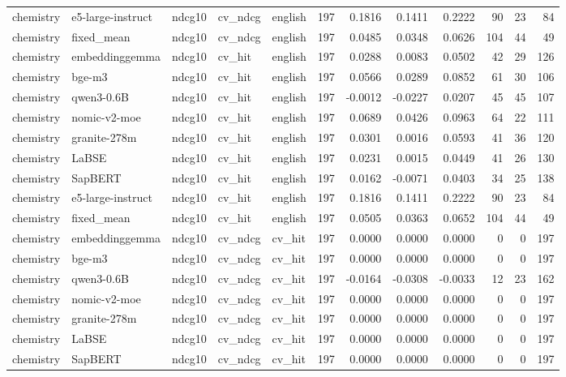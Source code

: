 \begin{tabular}{lllllrrrrrrr}
chemistry & e5-large-instruct & ndcg10 & cv\_ndcg & english & 197 & 0.1816 & 0.1411 & 0.2222 & 90 & 23 & 84 \\
chemistry & fixed\_mean & ndcg10 & cv\_ndcg & english & 197 & 0.0485 & 0.0348 & 0.0626 & 104 & 44 & 49 \\
chemistry & embeddinggemma & ndcg10 & cv\_hit & english & 197 & 0.0288 & 0.0083 & 0.0502 & 42 & 29 & 126 \\
chemistry & bge-m3 & ndcg10 & cv\_hit & english & 197 & 0.0566 & 0.0289 & 0.0852 & 61 & 30 & 106 \\
chemistry & qwen3-0.6B & ndcg10 & cv\_hit & english & 197 & -0.0012 & -0.0227 & 0.0207 & 45 & 45 & 107 \\
chemistry & nomic-v2-moe & ndcg10 & cv\_hit & english & 197 & 0.0689 & 0.0426 & 0.0963 & 64 & 22 & 111 \\
chemistry & granite-278m & ndcg10 & cv\_hit & english & 197 & 0.0301 & 0.0016 & 0.0593 & 41 & 36 & 120 \\
chemistry & LaBSE & ndcg10 & cv\_hit & english & 197 & 0.0231 & 0.0015 & 0.0449 & 41 & 26 & 130 \\
chemistry & SapBERT & ndcg10 & cv\_hit & english & 197 & 0.0162 & -0.0071 & 0.0403 & 34 & 25 & 138 \\
chemistry & e5-large-instruct & ndcg10 & cv\_hit & english & 197 & 0.1816 & 0.1411 & 0.2222 & 90 & 23 & 84 \\
chemistry & fixed\_mean & ndcg10 & cv\_hit & english & 197 & 0.0505 & 0.0363 & 0.0652 & 104 & 44 & 49 \\
chemistry & embeddinggemma & ndcg10 & cv\_ndcg & cv\_hit & 197 & 0.0000 & 0.0000 & 0.0000 & 0 & 0 & 197 \\
chemistry & bge-m3 & ndcg10 & cv\_ndcg & cv\_hit & 197 & 0.0000 & 0.0000 & 0.0000 & 0 & 0 & 197 \\
chemistry & qwen3-0.6B & ndcg10 & cv\_ndcg & cv\_hit & 197 & -0.0164 & -0.0308 & -0.0033 & 12 & 23 & 162 \\
chemistry & nomic-v2-moe & ndcg10 & cv\_ndcg & cv\_hit & 197 & 0.0000 & 0.0000 & 0.0000 & 0 & 0 & 197 \\
chemistry & granite-278m & ndcg10 & cv\_ndcg & cv\_hit & 197 & 0.0000 & 0.0000 & 0.0000 & 0 & 0 & 197 \\
chemistry & LaBSE & ndcg10 & cv\_ndcg & cv\_hit & 197 & 0.0000 & 0.0000 & 0.0000 & 0 & 0 & 197 \\
chemistry & SapBERT & ndcg10 & cv\_ndcg & cv\_hit & 197 & 0.0000 & 0.0000 & 0.0000 & 0 & 0 & 197 \\

\end{tabular}
